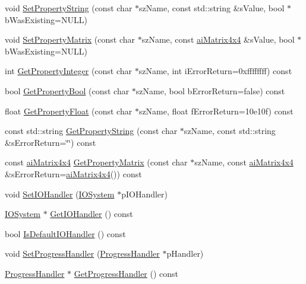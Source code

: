 \begin{DoxyCompactItemize}
void \hyperlink{class_assimp_1_1_importer_a8f79ecb5c6f67a76fc87654c32986e8e}{Set\+Property\+String} (const char $\ast$sz\+Name, const std\+::string \&s\+Value, bool $\ast$b\+Was\+Existing=N\+U\+LL)
\item 
void \hyperlink{class_assimp_1_1_importer_a3231ab8031c6fff87c0ce9eba0314a02}{Set\+Property\+Matrix} (const char $\ast$sz\+Name, const \hyperlink{structai_matrix4x4}{ai\+Matrix4x4} \&s\+Value, bool $\ast$b\+Was\+Existing=N\+U\+LL)
\item 
int \hyperlink{class_assimp_1_1_importer_a3e796a0758a9f10f13107f44c542ad41}{Get\+Property\+Integer} (const char $\ast$sz\+Name, int i\+Error\+Return=0xffffffff) const 
\item 
bool \hyperlink{class_assimp_1_1_importer_a90f5d35d25e5d2a0ef8bc0c6545b2010}{Get\+Property\+Bool} (const char $\ast$sz\+Name, bool b\+Error\+Return=false) const 
\item 
float \hyperlink{class_assimp_1_1_importer_a9a99a3467d6386ddcfbe2823f16b6640}{Get\+Property\+Float} (const char $\ast$sz\+Name, float f\+Error\+Return=10e10f) const 
\item 
const std\+::string \hyperlink{class_assimp_1_1_importer_aa31cc1aa8f83056fe097b149354ddfd3}{Get\+Property\+String} (const char $\ast$sz\+Name, const std\+::string \&s\+Error\+Return=\char`\"{}\char`\"{}) const 
\item 
const \hyperlink{structai_matrix4x4}{ai\+Matrix4x4} \hyperlink{class_assimp_1_1_importer_a1b2e36eab7155233846b24ec30e7e273}{Get\+Property\+Matrix} (const char $\ast$sz\+Name, const \hyperlink{structai_matrix4x4}{ai\+Matrix4x4} \&s\+Error\+Return=\hyperlink{structai_matrix4x4}{ai\+Matrix4x4}()) const 
\item 
void \hyperlink{class_assimp_1_1_importer_a1161f46318af18bb86dfe0fc3edea4df}{Set\+I\+O\+Handler} (\hyperlink{class_assimp_1_1_i_o_system}{I\+O\+System} $\ast$p\+I\+O\+Handler)
\item 
\hyperlink{class_assimp_1_1_i_o_system}{I\+O\+System} $\ast$ \hyperlink{class_assimp_1_1_importer_abe3af30f4c5eae2e875b0f32068be44d}{Get\+I\+O\+Handler} () const 
\item 
bool \hyperlink{class_assimp_1_1_importer_ae3f26466cf7756594216ffedbc247563}{Is\+Default\+I\+O\+Handler} () const 
\item 
void \hyperlink{class_assimp_1_1_importer_a6a4d830ffb3f77a3c7c919e0af006920}{Set\+Progress\+Handler} (\hyperlink{class_assimp_1_1_progress_handler}{Progress\+Handler} $\ast$p\+Handler)
\item 
\hyperlink{class_assimp_1_1_progress_handler}{Progress\+Handler} $\ast$ \hyperlink{class_assimp_1_1_importer_a1fa669f0edc504fdf9178e8e22c728ad}{Get\+Progress\+Handler} () const 

\end{DoxyCompactItemize}
